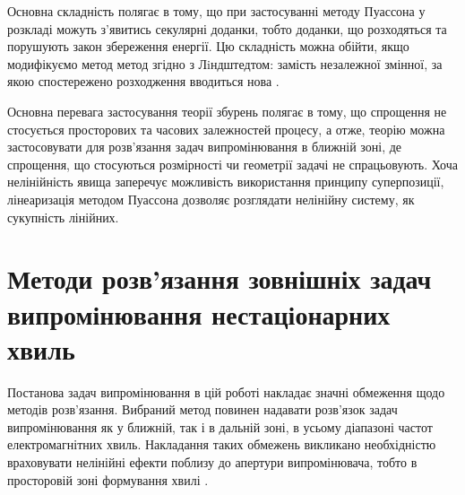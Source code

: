 Основна складність полягає в тому, що при застосуванні методу Пуассона у 
розкладі можуть з'явитись секулярні доданки, тобто доданки, що розходяться та 
порушують закон збереження енергії. Цю складність можна обійти, якщо 
модифікуємо метод метод згідно з Лiндштедтом: замість незалежної змінної, 
за якою спостережено розходження вводиться нова \cite{imp:Wien1931}.

Основна перевага застосування теорії збурень полягає в тому, що спрощення
не стосується просторових та часових залежностей процесу, а отже, теорію можна 
застосовувати для розв'язання задач випромінювання в ближній зоні, де 
спрощення, що стосуються розмірності чи геометрії задачі не спрацьовують.
Хоча нелінійність явища заперечує можливість використання принципу 
суперпозиції, лінеаризація методом Пуассона дозволяє розглядати нелінійну 
систему, як сукупність лінійних. 

\section{Методи розв'язання зовнішніх задач випромінювання нестаціонарних хвиль}


Постанова задач випромінювання в цій роботі накладає значні обмеження щодо 
методів розв'язання. Вибраний метод повинен надавати розв'язок задач 
випромінювання як у ближній, так і в дальній зоні, в усьому діапазоні 
частот електромагнітних хвиль. Накладання таких обмежень викликано
необхідністю враховувати нелінійні ефекти поблизу до апертури випромінювача, 
тобто в просторовій зоні формування хвилі \cite{imp:BaumUWBSP1}.



